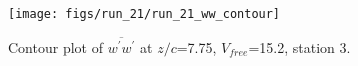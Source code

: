 \begin{figure}[H]
\centering
\texttt{[image: figs/run\_21/run\_21\_ww\_contour]}
\caption{Contour plot of $\overline{w^\prime w^\prime}$ at $z/c$=7.75, $V_{free}$=15.2, station 3.}
\label{fig:run_21_ww_contour}
\end{figure}


